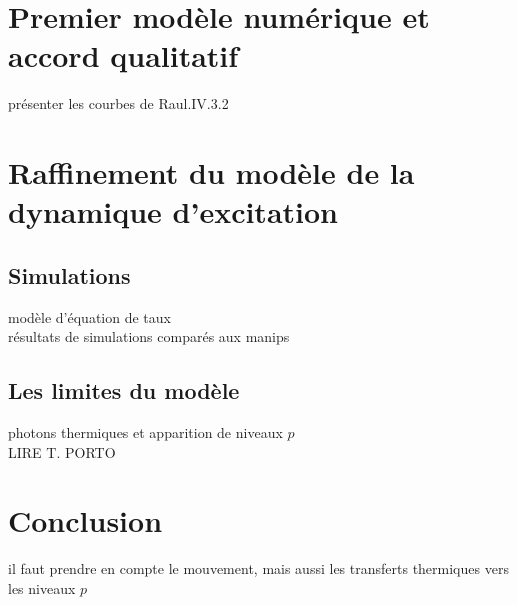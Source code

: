 \section{Premier modèle numérique et accord qualitatif}
		\noindent présenter les courbes de Raul.IV.3.2
		
\section{Raffinement du modèle de la dynamique d'excitation}
	\subsection{Simulations}
		\noindent modèle d'équation de taux\\
		\noindent résultats de simulations comparés aux manips\\
	\subsection{Les limites du modèle}
		\noindent photons thermiques et apparition de niveaux $p$ \\
		LIRE T. PORTO
		
%		
%		

\section*{Conclusion}
		\noindent il faut prendre en compte le mouvement, mais aussi les transferts thermiques vers les niveaux $p$
		
